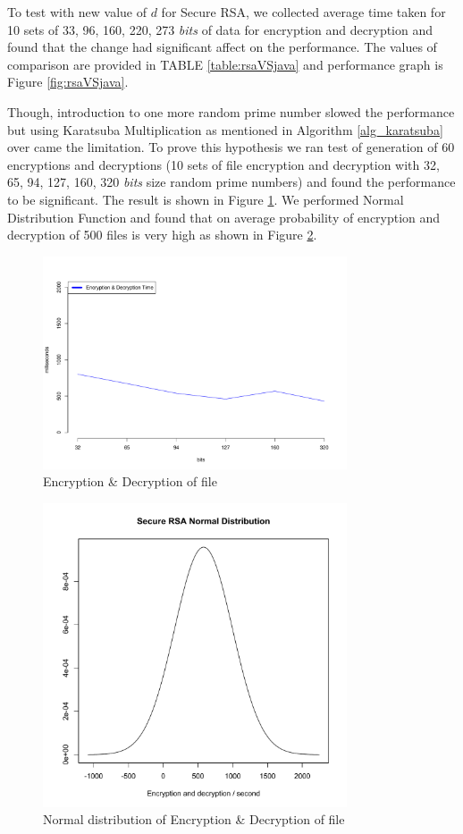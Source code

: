 \documentclass[12pt,journal,compsoc]{IEEEtran}
\begin{document}
To test with new value of $d$ for Secure RSA, we collected average time taken for 10 sets of 33, 96, 160, 220, 273 \emph{bits} of data for encryption and decryption and found that the change had significant affect on the performance. The values of comparison are provided in TABLE \ref{table:rsaVSjava} and performance graph is Figure \ref{fig:rsaVSjava}.



Though, introduction to one more random prime number slowed the performance but using Karatsuba Multiplication as mentioned in Algorithm \ref{alg_karatsuba} over came the limitation. To prove this hypothesis we ran test of generation of 60 encryptions and decryptions (10 sets of file encryption and decryption with 32, 65, 94, 127, 160, 320 \emph{bits} size random prime numbers) and found the performance to be significant. The result is shown in Figure \ref{fig:rsa_time}. We performed Normal Distribution Function and found that on average probability of encryption and decryption of 500 files is very high as shown in Figure \ref{fig:rsa_cdf}.

\begin{figure}[ht!]
\centering
\includegraphics[width=90mm]{images/encryptionTime.pdf}
\caption{Encryption \& Decryption of file}
\label{fig:rsa_time}
\end{figure}


\begin{figure}[ht!]
\centering
\includegraphics[width=90mm]{images/rsaPlot.pdf}
\caption{Normal distribution of Encryption \& Decryption of file}
\label{fig:rsa_cdf}
\end{figure}
\end{document}
